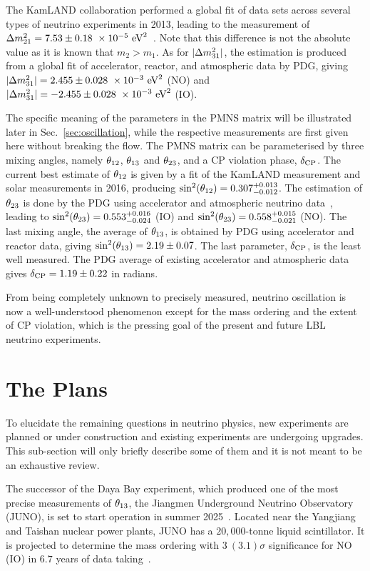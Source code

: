 The KamLAND collaboration performed a global fit of data sets across several types of neutrino experiments in 2013, leading to the measurement of $\Delta m^2_{21}=7.53\pm0.18~\times 10^{-5}~\textrm{eV}^2$~\cite{KamLAND:2013rgu}.
Note that this difference is not the absolute value as it is known that $m_2>m_1$.
As for $|\Delta m^2_{31}|$, the estimation is produced from a global fit of accelerator, reactor, and atmospheric data by PDG, giving $|\Delta m^2_{31}|=2.455\pm0.028~\times 10^{-3}~\textrm{eV}^2$ (NO) and $|\Delta m^2_{31}|=-2.455\pm0.028~\times 10^{-3}~\textrm{eV}^2$ (IO).

The specific meaning of the parameters in the PMNS matrix will be illustrated later in Sec.~\ref{sec:oscillation}, while the respective measurements are first given here without breaking the flow.
The PMNS matrix can be parameterised by three mixing angles, namely $\theta_{12}$, $\theta_{13}$ and $\theta_{23}$, and a CP violation phase, $\delta_\textrm{CP}$.
The current best estimate of $\theta_{12}$ is given by a fit of the KamLAND measurement and solar measurements in 2016, producing $\sin^2(\theta_{12})=0.307^{+0.013}_{-0.012}$.
The estimation of $\theta_{23}$ is done by the PDG using accelerator and atmospheric neutrino data~\cite{ParticleDataGroup:2024cfk}, leading to $\sin^2(\theta_{23})=0.553^{+0.016}_{-0.024}$ (IO) and $\sin^2(\theta_{23})=0.558^{+0.015}_{-0.021}$ (NO).
The last mixing angle, the average of $\theta_{13}$, is obtained by PDG using accelerator and reactor data, giving $\sin^2(\theta_{13})=2.19\pm0.07$.
The last parameter, $\delta_\textrm{CP}$, is the least well measured.
The PDG average of existing accelerator and atmospheric data gives $\delta_\textrm{CP}=1.19\pm0.22$ in radians.

From being completely unknown to precisely measured, neutrino oscillation is now a well-understood phenomenon except for the mass ordering and the extent of CP violation, which is the pressing goal of the present and future LBL neutrino experiments.
 
\section{The Plans}
To elucidate the remaining questions in neutrino physics, new experiments are planned or under construction and existing experiments are undergoing upgrades.
This sub-section will only briefly describe some of them and it is not meant to be an exhaustive review.

The successor of the Daya Bay experiment, which produced one of the most precise measurements of $\theta_{13}$, the Jiangmen Underground Neutrino Observatory (JUNO), is set to start operation in summer 2025~\cite{ScienceNews2025}.
Located near the Yangjiang and Taishan nuclear power plants, JUNO has a $20,000$-tonne liquid scintillator.
It is projected to determine the mass ordering with $3~(3.1)\sigma$ significance for NO (IO) in $6.7$ years of data taking~\cite{Paoloni:2024atc}.

